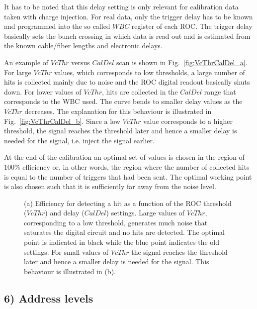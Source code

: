 It has to be noted that this delay setting is only relevant for calibration data taken with charge injection.
For real data, only the trigger delay has to be known and programmed into the so called $WBC$ register of each ROC.
The trigger delay basically sets the bunch crossing in which data is read out and is estimated from the known cable/fiber lengths and electronic delays.

An example of $VcThr$ versus $CalDel$ scan is shown in Fig.~\ref{fig:VcThrCalDel_a}.
For large $VcThr$ values, which corresponds to low thresholds, a large number of hits is collected mainly due to noise and the ROC digital readout basically shuts down.
For lower values of $VcThr$, hits are collected in the $CalDel$ range that corresponds to the WBC used.
The curve bends to smaller delay values as the $VcThr$ decreases. The explanation for this behaviour is illustrated in Fig.~\ref{fig:VcThrCalDel_b}.
Since a low $VcThr$ value corresponds to a higher threshold, the signal reaches the threshold later and hence a smaller delay is needed for the signal, i.e. inject the signal earlier.

At the end of the calibration an optimal set of values is chosen in the region of 100\% efficiency or, in other words, the region where the number of collected hits is equal to the number of triggers that had been sent.
The optimal working point is also chosen such that it is sufficiently far away from the noise level.

\begin{figure}[!htb]
 \begin{center}
 \end{center}
 \caption{(a) Efficiency for detecting a hit as a function of the ROC threshold ($VcThr$) and delay ($CalDel$) settings. Large values of $VcThr$, corresponding to a low threshold, generates much noise that saturates the digital circuit and no hits are detected. The optimal point is indicated in black while the blue point indicates the old settings. For small values of $VcThr$ the signal reaches the threshold later and hence a smaller delay is needed for the signal. This behaviour is illustrated in (b).}
 \label{fig:VcThrCalDel}
\end{figure}

\subsection*{6) Address levels}

